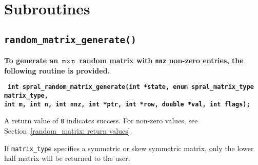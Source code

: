 
\section{Subroutines}

\subsection{\texttt{random\_matrix\_generate()}}
\textbf{
   To generate an $\texttt{m}\times \texttt{n}$ random matrix with \texttt{nnz}
non-zero entries, the following routine is provided.
}

\vspace*{0.1cm}
\noindent
\textbf{\texttt{
      \hspace*{0.3cm} int spral\_random\_matrix\_generate(int *state, enum spral\_matrix\_type matrix\_type, \\
       \hspace*{0.7cm} int m, int n, int nnz, int *ptr, int *row, double *val, int flags);
}}
\vspace*{0.3cm}

\noindent
A return value of \texttt{0} indicates success. For non-zero values, see Section~\ref{random_matrix: return values}.

\noindent
If \texttt{matrix\_type} specifies a
symmetric or skew symmetric matrix, only the lower half matrix will be returned
to the user.

